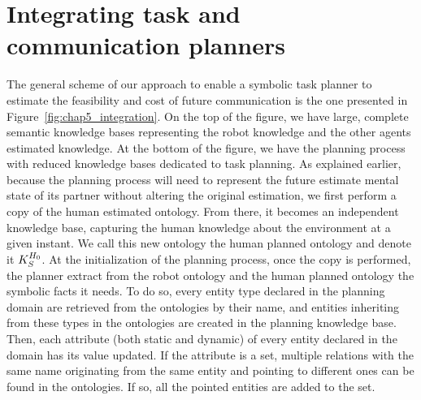 \section[Integrating planners]{Integrating task and communication planners}

The general scheme of our approach to enable a symbolic task planner to estimate the feasibility and cost of future communication is the one presented in Figure~\ref{fig:chap5_integration}. On the top of the figure, we have large, complete semantic knowledge bases representing the robot knowledge and the other agents estimated knowledge. At the bottom of the figure, we have the planning process with reduced knowledge bases dedicated to task planning. As explained earlier, because the planning process will need to represent the future estimate mental state of its partner without altering the original estimation, we first perform a copy of the human estimated ontology. From there, it becomes an independent knowledge base, capturing the human knowledge about the environment at a given instant. We call this new ontology the human planned ontology and denote it $K_S^{H_0}$. At the initialization of the planning process, once the copy is performed, the planner extract from the robot ontology and the human planned ontology the symbolic facts it needs. To do so, every entity type declared in the planning domain are retrieved from the ontologies by their name, and entities inheriting from these types in the ontologies are created in the planning knowledge base. Then, each attribute (both static and dynamic) of every entity declared in the domain has its value updated. If the attribute is a set, multiple relations with the same name originating from the same entity and pointing to different ones can be found in the ontologies. If so, all the pointed entities are added to the set.


